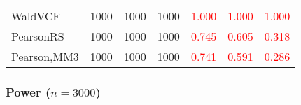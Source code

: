 \documentclass[
]{article}
\begin{document}
\begin{table}[H]
{\begin{tabular}[t]{lrrrrrr}
\hspace{1em}WaldVCF & 1000 & 1000 & 1000 & \textcolor{red}{1.000} & \textcolor{red}{1.000} & \textcolor{red}{1.000}\\
\hspace{1em}PearsonRS & 1000 & 1000 & 1000 & \textcolor{red}{0.745} & \textcolor{red}{0.605} & \textcolor{red}{0.318}\\
\hspace{1em}Pearson,MM3 & 1000 & 1000 & 1000 & \textcolor{red}{0.741} & \textcolor{red}{0.591} & \textcolor{red}{0.286}\\
\bottomrule
\end{tabular}}
\endgroup{}
\end{table}

\hypertarget{power-n3000-3}{%
\subsubsection{\texorpdfstring{Power
(\(n=3000\))}{Power (n=3000)}}\label{power-n3000-3}}
\end{document}
